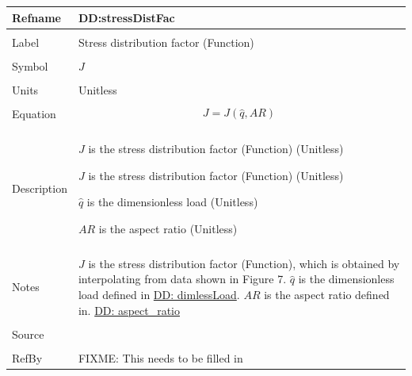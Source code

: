 \documentclass[12pt]{article}
\begin{document}
\noindent \begin{minipage}{\textwidth}
\begin{tabular}{p{} p{}}
\toprule \textbf{Refname} & \textbf{DD:stressDistFac}
\label{DD:stressDistFac}
\\ \midrule \\
Label & Stress distribution factor (Function)
\\ \midrule \\
Symbol & $J$
\\ \midrule \\
Units & Unitless
\\ \midrule \\
Equation & \begin{dmath}
           J=J\left(\hat{q},AR\right)
           \end{dmath}
\\ \midrule \\
Description & \begin{symbDescription}
              \item{$J$ is the stress distribution factor (Function) (Unitless)}
              \item{$J$ is the stress distribution factor (Function) (Unitless)}
              \item{$\hat{q}$ is the dimensionless load (Unitless)}
              \item{$AR$ is the aspect ratio (Unitless)}
              \end{symbDescription}
\\ \midrule \\
Notes & $J$ is the stress distribution factor (Function), which is obtained by interpolating from data shown in Figure 7.
        $\hat{q}$ is the dimensionless load defined in \hyperref[DD:dimlessLoad]{DD: dimlessLoad}.
        $AR$ is the aspect ratio defined in. \hyperref[DD:aspect.ratio]{DD: aspect\_ratio}
\\ \midrule \\
Source & \cite{astm2009}
\\ \midrule \\
RefBy & FIXME: This needs to be filled in
\\ \bottomrule \end{tabular}
\end{minipage}\\
~\newline
\end{document}
